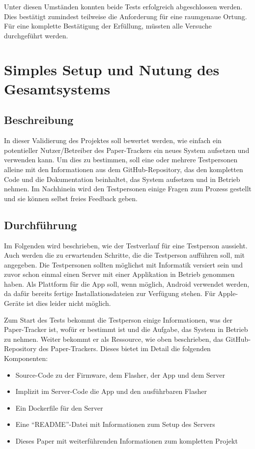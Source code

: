 Unter diesen Umständen konnten beide Tests erfolgreich abgeschlossen werden.
Dies bestätigt zumindest teilweise die Anforderung für eine raumgenaue Ortung.
Für eine komplette Bestätigung der Erfüllung, müssten alle Versuche durchgeführt werden.

\section{Simples Setup und Nutung des Gesamtsystems}
\subsection{Beschreibung}
In dieser Validierung des Projektes soll bewertet werden, wie einfach ein potentieller Nutzer/Betreiber
des Paper-Trackers ein neues System aufsetzen und verwenden kann.
Um dies zu bestimmen, soll eine oder mehrere Testpersonen alleine mit den Informationen aus dem GitHub-Repository, das
den kompletten Code und die Dokumentation beinhaltet, das System aufsetzen und in Betrieb nehmen.
Im Nachhinein wird den Testpersonen einige Fragen zum Prozess gestellt und sie können selbst freies Feedback geben.

\subsection{Durchführung}
Im Folgenden wird beschrieben, wie der Testverlauf für eine Testperson aussieht.
Auch werden die zu erwartenden Schritte, die die Testperson aufführen soll, mit angegeben.
Die Testpersonen sollten möglichst mit Informatik versiert sein und zuvor schon einmal einen Server mit einer
Applikation in Betrieb genommen haben.
Als Plattform für die App soll, wenn möglich, Android verwendet werden, da dafür bereits fertige Installationsdateien
zur Verfügung stehen.
Für Apple-Geräte ist dies leider nicht möglich.

Zum Start des Tests bekommt die Testperson einige Informationen, was der Paper-Tracker ist, wofür er bestimmt ist
und die Aufgabe, das System in Betrieb zu nehmen. 
Weiter bekommt er als Ressource, wie oben beschrieben, das GitHub-Repository des Paper-Trackers.
Dieses bietet im Detail die folgenden Komponenten:
\begin{itemize}
	\item Source-Code zu der Firmware, dem Flasher, der App und dem Server
	\item Implizit im Server-Code die App und den ausführbaren Flasher
	\item Ein Dockerfile für den Server
	\item Eine \enquote{README}-Datei mit Informationen zum Setup des Servers
	\item Dieses Paper mit weiterführenden Informationen zum kompletten Projekt
\end{itemize}

